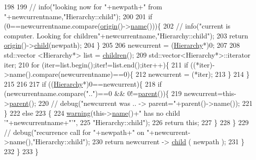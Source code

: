 \begin{DoxyCode}
198 
199       \textcolor{comment}{//      info("looking now for "+newpath+" from "+newcurrentname,"Hierarchy::child");}
200 
201       \textcolor{keywordflow}{if} (0==newcurrentname.compare(\hyperlink{classHierarchy_aee461dc930ce3871636ff87f075b1b83}{origin}()->\hyperlink{classObject_a300f4c05dd468c7bb8b3c968868443c1}{name}()))\{
202         \textcolor{comment}{//        info("current is computer. Looking for children"+newcurrentname,"Hierarchy::child");}
203         \textcolor{keywordflow}{return} \hyperlink{classHierarchy_aee461dc930ce3871636ff87f075b1b83}{origin}()->\hyperlink{classHierarchy_a1e207f973c694b538bf90107b4868817}{child}(newpath);
204       \}
205 
206       newcurrent = (\hyperlink{classHierarchy}{Hierarchy}*)0;
207 
208       std::vector <Hierarchy*> list = \hyperlink{classHierarchy_aa9a76f69e98e052ee1a6e32cea006288}{children}();
209       std::vector<Hierarchy*>::iterator iter;
210       \textcolor{keywordflow}{for} (iter=list.begin();iter!=list.end();iter++)\{
211         \textcolor{keywordflow}{if} ((*iter)->name().compare(newcurrentname)==0)\{
212           newcurrent = (*iter);
213         \}
214       \}
215 
216 
217       \textcolor{keywordflow}{if} ((\hyperlink{classHierarchy}{Hierarchy}*)0==newcurrent)\{
218         \textcolor{keywordflow}{if} (newcurrentname.compare(\textcolor{stringliteral}{".."})==0 && 0!=\hyperlink{classHierarchy_a1c7bec8257e717f9c1465e06ebf845fc}{parent}())\{
219           newcurrent=this->\hyperlink{classHierarchy_a1c7bec8257e717f9c1465e06ebf845fc}{parent}();
220           \textcolor{comment}{//          debug("newcurrent was .. -> parent="+parent()->name());}
221         \}
222         \textcolor{keywordflow}{else}
223         \{
224           \hyperlink{classObject_a65cd4fda577711660821fd2cd5a3b4c9}{warning}(this->\hyperlink{classObject_a300f4c05dd468c7bb8b3c968868443c1}{name}()+\textcolor{stringliteral}{" has no child '"}+newcurrentname+\textcolor{stringliteral}{"'"},
225               \textcolor{stringliteral}{"Hierarchy::child"});
226           \textcolor{keywordflow}{return} \textcolor{keyword}{this};
227         \}
228       \}
229       \textcolor{comment}{//      debug("recurrence call for "+newpath+" on "+newcurrent->name(),"Hierarchy::child");}
230       \textcolor{keywordflow}{return} newcurrent -> \hyperlink{classHierarchy_a1e207f973c694b538bf90107b4868817}{child} ( newpath );
231     \}
232   \}
233 \}
\end{DoxyCode}
\mbox{\label{classHierarchy_aa9a76f69e98e052ee1a6e32cea006288}} 
